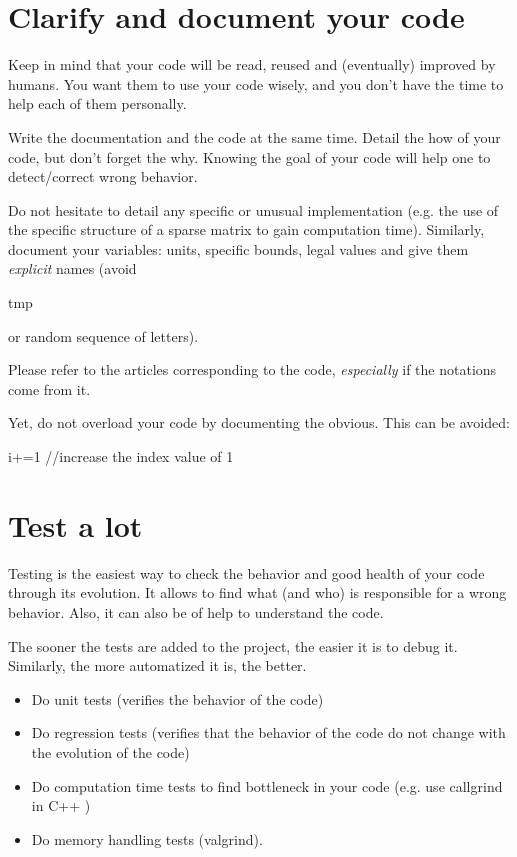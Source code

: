 
\section{Clarify and document your code}
Keep in mind that your code will be read, reused and (eventually) improved by humans.
You want them to use your code wisely, and you don't have the time to help each of them personally.

Write the documentation and the code at the same time. 
Detail the how of your code, but don't forget the why. 
Knowing the goal of your code will help one to detect/correct wrong behavior.

Do not hesitate to detail any specific or unusual implementation
(e.g. the use of the specific structure of a sparse matrix to gain computation time).
Similarly, document your variables: units, specific bounds, legal values and give them \textit{explicit} names (avoid \begin{tt}tmp\end{tt} or random sequence of letters).	

Please refer to the articles corresponding to the code, \textit{especially} if the notations come from it.

Yet, do not overload your code by documenting the obvious. This can be avoided:\\
\begin{tt} i+=1 //increase the index value of 1\end{tt}

\section{Test a lot}
Testing is the easiest way to check the behavior and good health of your code through its evolution.
It allows to find what (and who) is responsible for a wrong behavior.
Also, it can also be of help to understand the code.

The sooner the tests are added to the project, the easier it is to debug it.
Similarly, the more automatized it is, the better.
\begin{itemize}[noitemsep,topsep=0pt,parsep=0pt,partopsep=0pt]
\item Do unit tests (verifies the behavior of the code)
\item Do regression tests (verifies that the behavior of the code do not change with the evolution of the code)
\item Do computation time tests to find bottleneck in your code (e.g. use callgrind in C++ )
\item Do memory handling tests (valgrind).
\end{itemize}


